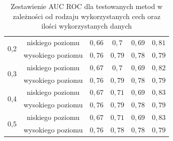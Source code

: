 \begin{table}[]
\begin{tabular}{|c|c|c|c|c|c|}
\multirow{2}{*}{0,2}   & niskiego poziomu  & $ 0,66 $ & $ 0,7 $ & $ 0,69 $ &$ 0,81 $ \\ \cline{2-6} 
                       & wysokiego poziomu & $ 0,76 $ & $ 0,79 $ & $ 0,78 $ &$ 0,79 $ \\ \hline
                       
\multirow{2}{*}{0,3}   & niskiego poziomu  & $ 0,67 $ & $ 0,7 $ & $ 0,69 $ &$ 0,82 $ \\ \cline{2-6} 
                       & wysokiego poziomu & $ 0,76 $ & $ 0,79 $ & $ 0,78 $ &$ 0,79 $ \\ \hline
                       
\multirow{2}{*}{0,4}   & niskiego poziomu  & $ 0,67 $ & $ 0,71 $ & $ 0,69 $ &$ 0,83 $ \\ \cline{2-6} 
                       & wysokiego poziomu & $ 0,76 $ & $ 0,79 $ & $ 0,78 $ &$ 0,79 $ \\ \hline
                       
\multirow{2}{*}{0,5}   & niskiego poziomu  & $ 0,67 $ & $ 0,71 $ & $ 0,69 $ &$ 0,83 $ \\ \cline{2-6} 
                       & wysokiego poziomu & $ 0,76 $ & $ 0,78 $ & $ 0,78 $ &$ 0,79 $ \\ \hline
\end{tabular}

\caption{Zestawienie AUC ROC dla testowanych metod w zależności od rodzaju wykorzystanych cech oraz ilości wykorzystanych danych}
\label{table:higgstable}

\end{table}


